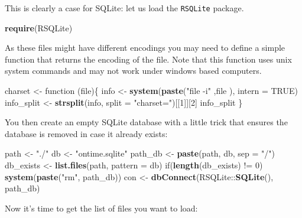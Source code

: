 \documentclass[]{book}
\newenvironment{Shaded}{\begin{snugshade}}{\end{snugshade}}
\newcommand{\KeywordTok}[1]{\textcolor[rgb]{0.13,0.29,0.53}{\textbf{{#1}}}}
\newcommand{\DataTypeTok}[1]{\textcolor[rgb]{0.13,0.29,0.53}{{#1}}}
\newcommand{\DecValTok}[1]{\textcolor[rgb]{0.00,0.00,0.81}{{#1}}}
\newcommand{\StringTok}[1]{\textcolor[rgb]{0.31,0.60,0.02}{{#1}}}
\newcommand{\OtherTok}[1]{\textcolor[rgb]{0.56,0.35,0.01}{{#1}}}
\newcommand{\NormalTok}[1]{{#1}}
\begin{document}
This is clearly a case for SQLite: let us load the \texttt{RSQLite}
package.

\begin{Shaded}
\begin{Highlighting}[]
\KeywordTok{require}\NormalTok{(RSQLite)}
\end{Highlighting}
\end{Shaded}

As these files might have different encodings you may need to define a
simple function that returns the encoding of the file. Note that this
function uses unix system commands and may not work under windows based
computers.

\begin{Shaded}
\begin{Highlighting}[]
\NormalTok{charset <-}\StringTok{ }\NormalTok{function (file)\{}
  \NormalTok{info <-}\StringTok{ }\KeywordTok{system}\NormalTok{(}\KeywordTok{paste}\NormalTok{(}\StringTok{"file -i"} \NormalTok{,file ), }\DataTypeTok{intern =} \OtherTok{TRUE}\NormalTok{)}
  \NormalTok{info_split <-}\StringTok{ }\KeywordTok{strsplit}\NormalTok{(info, }\DataTypeTok{split =} \StringTok{"charset="}\NormalTok{)[[}\DecValTok{1}\NormalTok{]][}\DecValTok{2}\NormalTok{]}
  \NormalTok{info_split}
\NormalTok{\}}
\end{Highlighting}
\end{Shaded}

You then create an empty SQLite database with a little trick that
ensures the database is removed in case it already exists:

\begin{Shaded}
\begin{Highlighting}[]
\NormalTok{path <-}\StringTok{ "./"}
\NormalTok{db <-}\StringTok{ "ontime.sqlite"}
\NormalTok{path_db <-}\StringTok{ }\KeywordTok{paste}\NormalTok{(path, db, }\DataTypeTok{sep =} \StringTok{"/"}\NormalTok{)}
\NormalTok{db_exists <-}\StringTok{ }\KeywordTok{list.files}\NormalTok{(path, }\DataTypeTok{pattern =} \NormalTok{db)}
\NormalTok{if(}\KeywordTok{length}\NormalTok{(db_exists) !=}\StringTok{ }\DecValTok{0}\NormalTok{) }\KeywordTok{system}\NormalTok{(}\KeywordTok{paste}\NormalTok{(}\StringTok{"rm"}\NormalTok{, path_db))}
\NormalTok{con <-}\StringTok{ }\KeywordTok{dbConnect}\NormalTok{(RSQLite::}\KeywordTok{SQLite}\NormalTok{(), path_db)}
\end{Highlighting}
\end{Shaded}

Now it's time to get the list of files you want to load:
\end{document}
